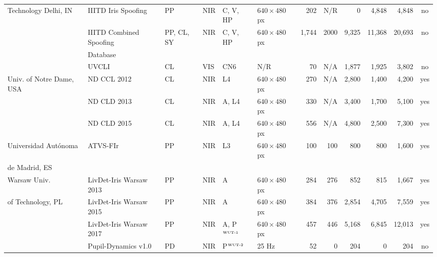 \documentclass[format=acmsmall, review=false, timestamp=false]{acmart}
\begin{document}
\begin{landscape}
\begin{table}[htb!]
\begin{center}
\begin{threeparttable}
\begin{tabular}{llllllrrrrrc}
            Technology Delhi, IN & {\sf IIITD Iris Spoofing}\tnote{6}\hskip2mm\cite{Gupta_ICPR_2014} & PP & NIR & C, V, HP & $640 \times 480$ px\tnote{7}& 202 & N/R & 0 & 4,848 & 4,848 & {no} \\ 
             & {\sf IIITD Combined Spoofing} & PP, CL, SY & NIR & C, V, HP & $640 \times 480$ px & 1,744 & 2000\tnote{8} & 9,325 & 11,368 & 20,693 & {no} \\ 
             & {\sf Database}\tnote{9}\hskip2mm\cite{Kohli_BTAS_2016} \color{blue}{\cite{IIITD_DBs_URL}} &  & & & & & & & & & \\ 
            & {\sf UVCLI}\tnote{10}\hskip2mm\cite{Yadav_IJCB_2017} & CL & VIS & CN6 & N/R & 70 & {N/A} & 1,877 & 1,925 & 3,802 & {no} \\ \hline 
            Univ. of Notre Dame, USA & {\sf ND CCL 2012} \cite{Doyle_ICB_2013} & CL & NIR & L4 & $640 \times 480$ px & {270} & {N/A} & {2,800} & {1,400} & 4,200 & {yes} \\ 
             & {\sf ND CLD 2013} \cite{Doyle_BTAS_2013} & CL & NIR & A, L4 & $640 \times 480$ px & {330} & {N/A} & {3,400} & {1,700} & 5,100 & {yes} \\ 
             & {\sf ND CLD 2015} \cite{Doyle_IEEEAccess_2015} & CL & NIR & A, L4 & $640 \times 480$ px & 556 & {N/A} & 4,800 & 2,500 & 7,300 & {yes} \\ 
            \hline
            Universidad Aut\'{o}noma  & {\sf ATVS-FIr} \cite{Galbally_ICB_2012} & PP & NIR & L3 & $640 \times 480$ px & 100 & 100 & 800 & 800 & 1,600 & {yes} \\ 
            de Madrid, ES & & & & & & & & & & & \\ 
            \hline
            Warsaw Univ. & {\sf LivDet-Iris Warsaw 2013} \cite{Czajka_ICMMAR_2013} \color{blue}{\cite{WARSAW_DBs_URL}} & PP & NIR & A & $640 \times 480$ px & 284 & 276 & 852 & 815 & 1,667 & {yes} \\ 
            of Technology, PL & {\sf LivDet-Iris Warsaw 2015}\tnote{11}\hskip2mm\cite{Yambay_ISBA_2017} \color{blue}{\cite{WARSAW_DBs_URL}}& PP & NIR  & A & $640\times 480$ px & 384 & 376 & 2,854 & 4,705 & 7,559 & {yes} \\
            & {\sf LivDet-Iris Warsaw 2017}\tnote{12}\hskip2mm\cite{Yambay_IJCB_2017} \color{blue}{\cite{WARSAW_DBs_URL}}& PP & NIR & A, P$^{\mbox{\tiny WUT-1}}$ & $640\times 480$ px & 457 & 446 & 5,168 & 6,845 & 12,013 & {yes} \\ 
            & {\sf Pupil-Dynamics v1.0}\tnote{13}\hskip2mm\cite{Czajka_TIFS_2015} \color{blue}{\cite{WARSAW_DBs_URL}}& PD & NIR & P$^{\mbox{\tiny WUT-2}}$ & 25 Hz & 52 & 0 & 204 & 0 & 204 & {no} \\

\end{tabular}
\end{threeparttable}
\end{center}
\end{table}
\end{landscape}
\end{document}
